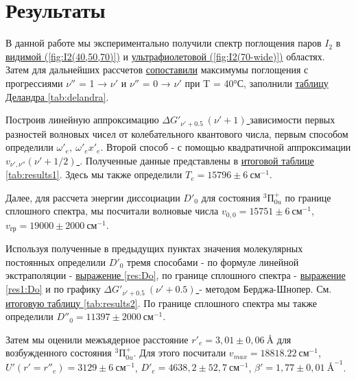 \documentclass{article}
\begin{document}
 \newpage
\section{Результаты}

В данной работе мы экспериментально получили спектр поглощения паров $I_2$ в \hyperref[fig:I2(40)]{видимой (\ref*{fig:I2(40,50,70)})} и \hyperref[fig:I2(70-wide)]{ультрафиолетовой (\ref*{fig:I2(70-wide)})} областях. Затем для дальнейших рассчетов \hyperref[fig:I2(40)]{сопоставили}  максимумы поглощения с прогрессиями $\nu ''$ = 1 → $\nu '$ и $\nu ''$ = 0 → $\nu '$ при T = 40°С, заполнили \hyperref[tab:delandra]{таблицу Деландра \ref*{tab:delandra}}. 

Построив линейную аппроксимацию \hyperref[fig:G(nu)]{ $\Delta G'_{\nu' +0.5}~ (\nu'+1)$ }  зависимости первых разностей волновых чисел от колебательного квантового числа, первым способом определили $\omega'_e,~\omega'_e x'_e$. Второй способ - с помощью квадратичной аппроксимации \hyperref[fig:v(nu)]{ $v_{\nu', \nu''} (\nu'+1/2)$ }. Полученные данные представлены в \hyperref[tab:results1]{итоговой таблице \ref*{tab:results1}}.  Здесь мы также определили $T_e = 15796 \pm 6~ см^{-1}$.

Далее, для рассчета энергии диссоциации $D'_0$ для состояния $^3П^+_{0u}$ по границе сплошного спектра, мы посчитали волновые числа $v_{0,0} = 15751 \pm 6 ~см^{-1}$, $v_{гр} = 19000 \pm 2000 ~см^{-1}$.

Используя полученные в предыдущих пунктах значения молекулярных постоянных определили $D'_0$ тремя способами - по формуле линейной экстраполяции - \hyperref[res:Do]{ выражение \ref*{res:Do}}, по границе сплошного спектра - \hyperref[res1:Do]{ выражение \ref*{res1:Do}} и по графику \hyperref[fig:I2-berdg]{$\Delta G'_{\nu'+0.5} ~(\nu' +0.5)$ } - методом Берджа-Шнопер. См. \hyperref[tab:results2]{итоговую таблицу \ref*{tab:results2}}. По границе сплошного спектра мы также определили $D''_0 = 11397 \pm 2000~см^{-1}$.

Затем мы оценили межъядерное расстояние $r'_e = 3,01\pm0,06~\text{\AA}$ для возбужденного состояния $^3П^+_{0u}$. Для этого посчитали $v_{max} = 18818.22~см^{-1}$, $U'(r'= r''_e) = 3129 \pm 6~см^{-1}$, $D'_e = 4638,2 \pm 52,7~см^{-1}$, $\beta' = 1,77\pm 0,01~\text{\AA}^{-1}$. 
\end{document}
